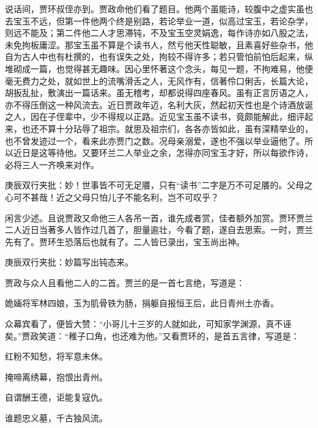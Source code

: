 \begin{parag}
    说话间，贾环叔侄亦到。贾政命他们看了题目。他两个虽能诗，较腹中之虚实虽也去宝玉不远，但第一件他两个终是别路，若论举业一道，似高过宝玉，若论杂学，则远不能及；第二件他二人才思滞钝，不及宝玉空灵娟逸，每作诗亦如八股之法，未免拘板庸涩。那宝玉虽不算是个读书人，然亏他天性聪敏，且素喜好些杂书，他自为古人中也有杜撰的，也有误失之处，拘较不得许多；若只管怕前怕后起来，纵堆砌成一篇，也觉得甚无趣味。因心里怀著这个念头，每见一题，不拘难易，他便毫无费力之处，就如世上的流嘴滑舌之人，无风作有，信著伶口俐舌，长篇大论，胡扳乱扯，敷演出一篇话来。虽无稽考，却都说得四座春风。虽有正言厉语之人，亦不得压倒这一种风流去。近日贾政年迈，名利大灰，然起初天性也是个诗酒放诞之人，因在子侄辈中，少不得规以正路。近见宝玉虽不读书，竟颇能解此，细评起来，也还不算十分玷辱了祖宗。就思及祖宗们，各各亦皆如此，虽有深精举业的，也不曾发迹过一个，看来此亦贾门之数。况母亲溺爱，遂也不强以举业逼他了。所以近日是这等待他。又要环兰二人举业之余，怎得亦同宝玉才好，所以每欲作诗，必将三人一齐唤来对作。\begin{note}庚辰双行夹批：妙！世事皆不可无足餍，只有“读书”二字是万不可足餍的。父母之心可不甚哉！近之父母只怕儿子不能名利，岂不可叹乎？\end{note}
\end{parag}


\begin{parag}
    闲言少述。且说贾政又命他三人各吊一首，谁先成者赏，佳者额外加赏。贾环贾兰二人近日当著多人皆作过几首了，胆量逾壮，今看了题，遂自去思索。一时，贾兰先有了。贾环生恐落后也就有了。二人皆已录出，宝玉尚出神。\begin{note}庚辰双行夹批：妙篇写出钝态来。\end{note}贾政与众人且看他二人的二首。贾兰的是一首七言绝，写道是：
\end{parag}
\begin{poem}
    \begin{pl}
        姽婳将军林四娘，玉为肌骨铁为肠，捐躯自报恒王后，此日青州土亦香。
    \end{pl}
\end{poem}

\begin{parag}
    众幕宾看了，便皆大赞：“小哥儿十三岁的人就如此，可知家学渊源，真不诬矣。”贾政笑道：“稚子口角，也还难为他。”又看贾环的，是首五言律，写道是：
\end{parag}
\begin{poem}

    \begin{pl}
        红粉不知愁，将军意未休。
    \end{pl}
    \begin{pl}
        掩啼离绣幕，抱恨出青州。
    \end{pl}
    \begin{pl}
        自谓酬王德，讵能复寇仇。
    \end{pl}
    \begin{pl}
        谁题忠义墓，千古独风流。
    \end{pl}

\end{poem}



